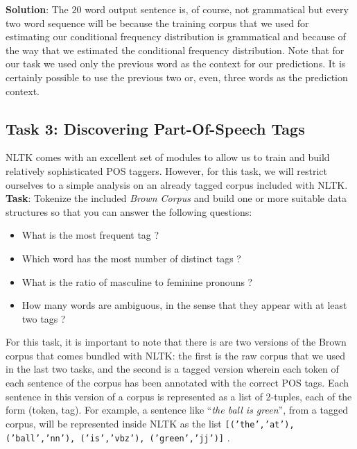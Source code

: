 \documentclass[11pt]{article}
\begin{document}
\noindent \textbf{Solution}: The $20$ word output sentence is, of course, not grammatical but every two word sequence will be because the training corpus that we used for estimating our conditional frequency distribution is grammatical and because of the way that we estimated the conditional frequency distribution. Note that for our task we used only the previous word as the context for our predictions. It is certainly possible to use the previous two or, even, three words as the prediction context.

\subsection{Task 3: Discovering Part-Of-Speech Tags} %
\label{sub:task_3_discovering_part_of_speech_tags}

NLTK comes with an excellent set of modules to allow us to train and build relatively sophisticated POS taggers. However, for this task, we will restrict ourselves to a simple analysis on an already tagged corpus included with NLTK. \\

\noindent \textbf{Task}: Tokenize the included \emph{Brown Corpus} and build one or more suitable data structures so that you can answer the following questions:
\begin{itemize}
    \item What is the most frequent tag ?
    \item Which word has the most number of distinct tags ?
    \item What is the ratio of masculine to feminine pronouns ?
    \item How many words are ambiguous, in the sense that they appear with at least two tags ?
\end{itemize}

For this task, it is important to note that there is are two versions of the Brown corpus that comes bundled with NLTK: the first is the raw corpus that we used in the last two tasks, and the second is a tagged version wherein each token of each sentence of the corpus has been annotated with the correct POS tags. Each sentence in this version of a corpus is represented as a list of 2-tuples, each of the form (token, tag). For example, a sentence like ``\emph{the ball is green}'', from a tagged corpus, will be represented inside NLTK as the list \texttt{[('the','at'), ('ball','nn'), ('is','vbz'), ('green','jj')]} .
\end{document}
